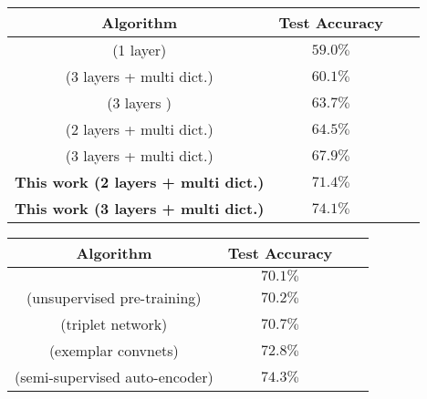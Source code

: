 \documentclass{article} \usepackage{iclr2016_workshop,times}
\begin{document}
\begin{table*}[t!]

\caption{Classification accuracy on STL-10.}
\label{stl-results}
\begin{subtable}{\linewidth}
 \centering
 \caption{Algorithms that learn the filters unsupervised.}
\begin{tabular}{cccc}
\multicolumn{1}{c}{\bf Algorithm} &\multicolumn{1}{c}{\bf Test Accuracy}
\\ \hline
\cite{coates2011importance} (1 layer)                                                       &$59.0  \%$ \\        
\cite{coates2011selecting}   (3 layers + multi dict.)                                    &$60.1 \% $\\         
 \cite{hui2013direct}   (3 layers )                                                                &$63.7 \%$ \\         
\cite{bo2013unsupervised}  (2 layers + multi dict.)                                    &$64.5 \%$ \\         
\cite{lin2014stable}  (3 layers + multi dict.)                                                &$67.9 \%$  \\        


 \hline
\textbf{This work (2 layers + multi dict.)}                                                                 &$71.4 \%$ \\       
\textbf{This work (3 layers + multi dict.)}                                                                 &$74.1\%$ \\       
 \hline


\end{tabular}

\end{subtable}

\vspace{4mm}

 \begin{subtable}{\linewidth}
 \centering
 \caption{Supervised and semi-supervised algorithms.}
\begin{tabular}{cccc}
\multicolumn{1}{c}{\bf Algorithm} &\multicolumn{1}{c}{\bf Test Accuracy}\\ \hline

 \cite{swersky2013multi}                                                                             &$70.1\%$\\
  \cite{paine2014analysis}(unsupervised pre-training)                                &$70.2\%$\\
 \cite{hoffer2014deep} (triplet network)                                                       &$70.7 \%$ \\
 \cite{dosovitskiy2014discriminative} (exemplar convnets)                         &$72.8\%$ \\
  \cite{zhao2015stacked} (semi-supervised auto-encoder)                         &$74.3\%$ \\
   \hline

\end{tabular}
\end{subtable}
\end{table*}
\end{document}
